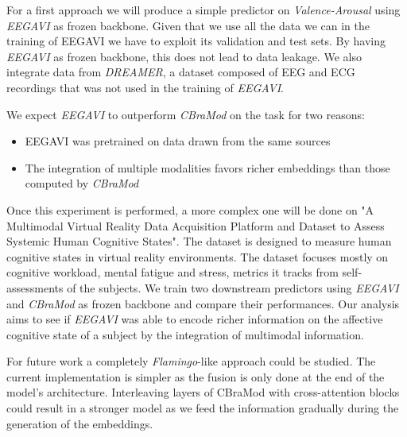 For a first approach we will produce a simple predictor on \textit{Valence-Arousal} using \textit{EEGAVI} as frozen backbone.
Given that we use all the data we can in the training of EEGAVI we have to exploit its validation and test sets.
By having \textit{EEGAVI} as frozen backbone, this does not lead to data leakage.
We also integrate data from \textit{DREAMER}, a dataset composed of EEG and ECG recordings that was not used in the training of \textit{EEGAVI}.

We expect \textit{EEGAVI} to outperform \textit{CBraMod} on the task for two reasons:
\begin{itemize}
    \item EEGAVI was pretrained on data drawn from the same sources
    \item The integration of multiple modalities favors richer embeddings than those computed by \textit{CBraMod}
\end{itemize}

Once this experiment is performed, a more complex one will be done on "A Multimodal Virtual Reality Data Acquisition Platform and Dataset to Assess Systemic Human Cognitive States"\cite{Aygun2025}.
The dataset is designed to measure human cognitive states in virtual reality environments.
The dataset focuses mostly on cognitive workload, mental fatigue and stress, metrics it tracks from self-assessments of the subjects.
We train two downstream predictors using \textit{EEGAVI} and \textit{CBraMod} as frozen backbone and compare their performances.
Our analysis aims to see if \textit{EEGAVI} was able to encode richer information on the affective cognitive state of a subject by the integration of multimodal information.

For future work a completely \textit{Flamingo}-like approach could be studied.
The current implementation is simpler as the fusion is only done at the end of the model's architecture.
Interleaving layers of CBraMod with cross-attention blocks could result in a stronger model as we feed the information gradually during the generation of the embeddings.
